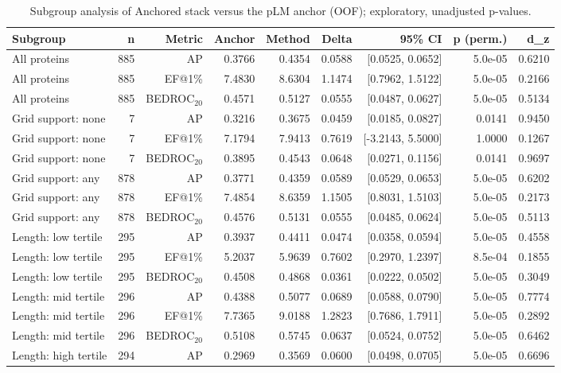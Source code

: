 \begin{table}[t]
\centering
\small
\caption{Subgroup analysis of Anchored stack versus the pLM anchor (OOF); exploratory, unadjusted p-values.}
\label{tab:table5_subgroups_oof}
\begin{tabular}{lrrrrrrrr}
\toprule
Subgroup & n & Metric & Anchor & Method & Delta & 95\% CI & p (perm.) & d\_z \\
\midrule
All proteins & 885 & AP & 0.3766 & 0.4354 & 0.0588 & [0.0525, 0.0652] & 5.0e-05 & 0.6210 \\
All proteins & 885 & EF@1\% & 7.4830 & 8.6304 & 1.1474 & [0.7962, 1.5122] & 5.0e-05 & 0.2166 \\
All proteins & 885 & BEDROC$_{20}$ & 0.4571 & 0.5127 & 0.0555 & [0.0487, 0.0627] & 5.0e-05 & 0.5134 \\
Grid support: none & 7 & AP & 0.3216 & 0.3675 & 0.0459 & [0.0185, 0.0827] & 0.0141 & 0.9450 \\
Grid support: none & 7 & EF@1\% & 7.1794 & 7.9413 & 0.7619 & [-3.2143, 5.5000] & 1.0000 & 0.1267 \\
Grid support: none & 7 & BEDROC$_{20}$ & 0.3895 & 0.4543 & 0.0648 & [0.0271, 0.1156] & 0.0141 & 0.9697 \\
Grid support: any & 878 & AP & 0.3771 & 0.4359 & 0.0589 & [0.0529, 0.0653] & 5.0e-05 & 0.6202 \\
Grid support: any & 878 & EF@1\% & 7.4854 & 8.6359 & 1.1505 & [0.8031, 1.5103] & 5.0e-05 & 0.2173 \\
Grid support: any & 878 & BEDROC$_{20}$ & 0.4576 & 0.5131 & 0.0555 & [0.0485, 0.0624] & 5.0e-05 & 0.5113 \\
Length: low tertile & 295 & AP & 0.3937 & 0.4411 & 0.0474 & [0.0358, 0.0594] & 5.0e-05 & 0.4558 \\
Length: low tertile & 295 & EF@1\% & 5.2037 & 5.9639 & 0.7602 & [0.2970, 1.2397] & 8.5e-04 & 0.1855 \\
Length: low tertile & 295 & BEDROC$_{20}$ & 0.4508 & 0.4868 & 0.0361 & [0.0222, 0.0502] & 5.0e-05 & 0.3049 \\
Length: mid tertile & 296 & AP & 0.4388 & 0.5077 & 0.0689 & [0.0588, 0.0790] & 5.0e-05 & 0.7774 \\
Length: mid tertile & 296 & EF@1\% & 7.7365 & 9.0188 & 1.2823 & [0.7686, 1.7911] & 5.0e-05 & 0.2892 \\
Length: mid tertile & 296 & BEDROC$_{20}$ & 0.5108 & 0.5745 & 0.0637 & [0.0524, 0.0752] & 5.0e-05 & 0.6462 \\
Length: high tertile & 294 & AP & 0.2969 & 0.3569 & 0.0600 & [0.0498, 0.0705] & 5.0e-05 & 0.6696 \\

\end{tabular}
\end{table}
